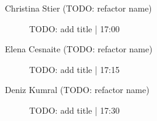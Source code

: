 \begin{symposium}
\begin{description}
                \item [Christina Stier  (TODO: refactor name)] TODO: add title \textcolor{mygray}{ | 17:00}    
                
                \item [Elena Cesnaite (TODO: refactor name)] TODO: add title \textcolor{mygray}{ | 17:15}    
                
                \item [Deniz Kumral (TODO: refactor name)] TODO: add title \textcolor{mygray}{ | 17:30}    
                
            \end{description} 
            \end{symposium}
            